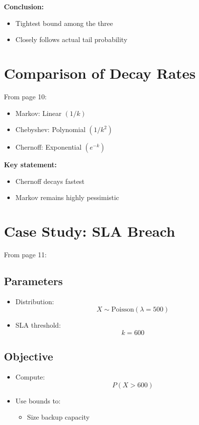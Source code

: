 \documentclass[11pt]{article}
\begin{document}
\textbf{Conclusion:}

\begin{itemize}
\item Tightest bound among the three
\item Closely follows actual tail probability
\end{itemize}

\section{Comparison of Decay Rates}

From page 10:

\begin{itemize}
\item Markov: Linear $(1/k)$
\item Chebyshev: Polynomial $(1/k^2)$
\item Chernoff: Exponential $(e^{-k})$
\end{itemize}

\textbf{Key statement:}

\begin{itemize}
\item Chernoff decays fastest
\item Markov remains highly pessimistic
\end{itemize}

\section{Case Study: SLA Breach}

From page 11:

\subsection{Parameters}

\begin{itemize}
\item Distribution:
\[
X \sim \text{Poisson}(\lambda = 500)
\]

\item SLA threshold:
\[
k = 600
\]
\end{itemize}

\subsection{Objective}

\begin{itemize}
\item Compute:
\[
P(X > 600)
\]

\item Use bounds to:
\begin{itemize}
\item Size backup capacity
\end{itemize}
\end{itemize}
\end{document}
